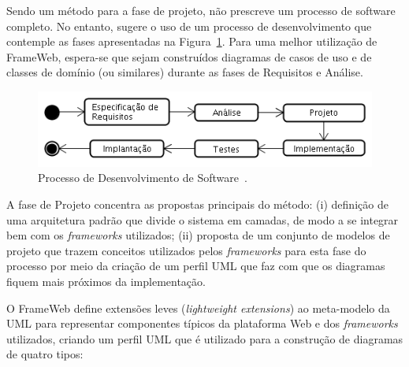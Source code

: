 Sendo um método para a fase de projeto, não prescreve um processo de software completo. No entanto, sugere o uso de um processo de desenvolvimento que contemple as fases apresentadas na Figura~\ref{fig-referencial-processo-software}. Para uma melhor utilização de FrameWeb, espera-se que sejam construídos diagramas de casos de uso e de classes de domínio (ou similares) durante as fases de Requisitos e Análise. 

\begin{figure}[h]
	\centering
	\includegraphics[width=1\textwidth]{figuras/referencial/fig-referencial-processo-software}
	\caption{Processo de Desenvolvimento de Software~\cite{vitorFrameWeb}.}
	\label{fig-referencial-processo-software}
\end{figure}

A fase de Projeto concentra as propostas principais do método: (i) definição de uma arquitetura padrão que divide o sistema em camadas, de modo a se integrar bem com os \textit{frameworks} utilizados; (ii) proposta de um conjunto de modelos de projeto que trazem conceitos utilizados pelos \textit{frameworks} para esta fase do processo por meio da criação de um perfil UML que faz com que os diagramas fiquem mais próximos da implementação.

O FrameWeb define extensões leves (\textit{lightweight extensions}) ao meta-modelo da UML para representar componentes típicos da plataforma Web e dos \textit{frameworks} utilizados, criando um perfil UML que é utilizado para a construção de diagramas de quatro tipos:


